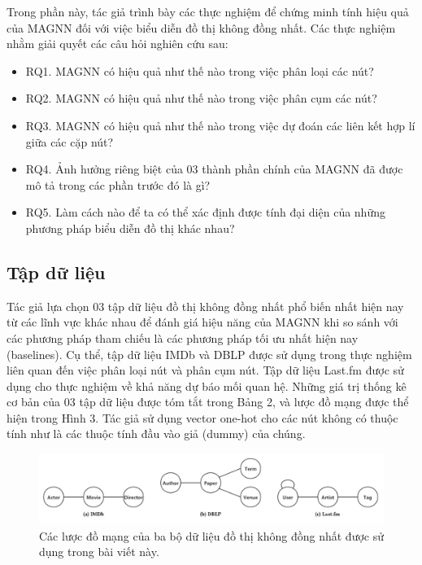 Trong phần này, tác giả trình bày các thực nghiệm để chứng minh tính hiệu quả của MAGNN đối với việc biểu diễn đồ thị không đồng nhất. Các thực nghiệm nhằm giải quyết các câu hỏi nghiên cứu sau:

\begin{itemize}
  \item RQ1. MAGNN có hiệu quả như thế nào trong việc phân loại các nút?
  \item RQ2. MAGNN có hiệu quả như thế nào trong việc phân cụm các nút?
  \item RQ3. MAGNN có hiệu quả như thế nào trong việc dự đoán các liên kết hợp lí giữa các cặp nút?
  \item RQ4. Ảnh hưởng riêng biệt của 03 thành phần chính của MAGNN đã được mô tả trong các phần trước đó là gì?
  \item RQ5. Làm cách nào để ta có thể xác định được tính đại diện của những phương pháp biểu diễn đồ thị khác nhau?
\end{itemize}

\subsection{Tập dữ liệu}
Tác giả lựa chọn 03 tập dữ liệu đồ thị không đồng nhất phổ biến nhất hiện nay từ các lĩnh vực khác nhau để đánh giá hiệu năng của MAGNN khi so sánh với các phương pháp tham chiếu là các phương pháp tối ưu nhất hiện nay (baselines). Cụ thể, tập dữ liệu IMDb và DBLP được sử dụng trong thực nghiệm liên quan đến việc phân loại nút và phân cụm nút. Tập dữ liệu Last.fm được sử dụng cho thực nghiệm về khả năng dự báo mối quan hệ. Những giá trị thống kê cơ bản của 03 tập dữ liệu được tóm tắt trong Bảng 2, và lược đồ mạng được thể hiện trong Hình 3. Tác giả sử dụng vector one-hot cho các nút không có thuộc tính như là các thuộc tính đầu vào giả (dummy) của chúng. 

\begin{figure}
  \includegraphics[width=\textwidth]{figs/fig3.png}
  \caption{Các lược đồ mạng của ba bộ dữ liệu đồ thị không đồng nhất được sử dụng trong bài viết này.}
\end{figure}


